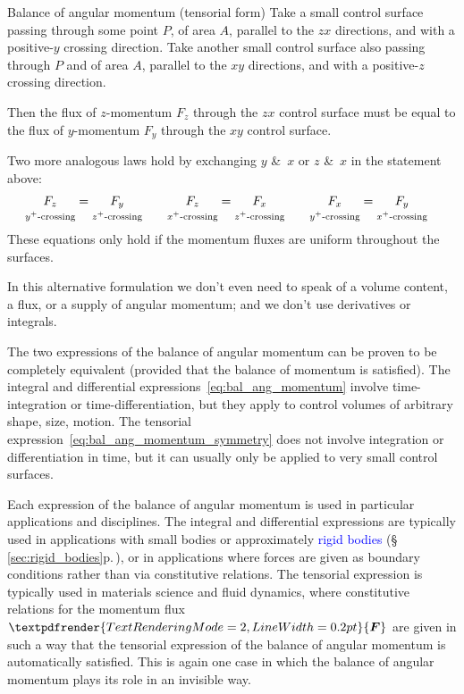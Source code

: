 \documentclass[a4paper,12pt,%
onecolumn,oneside,%
british%
]{memoir}
\newcommand*{\amp}{\&}
\renewcommand*{\bm}[1]{\textpdfrender{TextRenderingMode=2,LineWidth=0.2pt}{\boldsymbol{#1}}}
\renewcommand*{\|}[1][]{\nonscript\:#1\vert\nonscript\:\mathopen{}}
\newcommand*{\sect}{\S}%
\renewcommand*{\autoref}[3][\sect\,\ref]{\textcolor{blue}{#3} {\color{blue}\scriptsize(\faIcon[regular]{eye}\;#1{#2}\;p.\,\pageref{#2})}}
\newcommand*{\yF}{\bm{F}}
\begin{document}
\begin{definition}{Balance of angular momentum (tensorial form)}
  Take a small control surface passing through some point $P$, of area $A$, parallel to the $zx$ directions, and with a positive-$y$ crossing direction. Take another small control surface also passing through $P$ and of area $A$, parallel to the $xy$ directions, and with a positive-$z$ crossing direction.

  \smallskip

  Then the flux of $z$-momentum $F_{z}$ through the $zx$ control surface must be equal to the flux of $y$-momentum $F_{y}$ through the $xy$ control surface.

\smallskip

  Two more analogous laws hold by exchanging $y$ \amp\ $x$ or $z$ \amp\ $x$ in the statement above:
  \begin{equation}
    \label{eq:bal_ang_momentum_symmetry}
    \begin{aligned}
      \underbracket[0pt]{\smash{F_{z}}}_{\text{$y^{+}$-crossing}}
      &=
      \underbracket[0pt]{\smash{F_{y}}}_{\text{$z^{+}$-crossing}}
&\quad
      \underbracket[0pt]{\smash{F_{z}}}_{\text{$x^{+}$-crossing}}
      &=
      \underbracket[0pt]{\smash{F_{x}}}_{\text{$z^{+}$-crossing}}
&\quad
      \underbracket[0pt]{\smash{F_{x}}}_{\text{$y^{+}$-crossing}}
      &=
      \underbracket[0pt]{\smash{F_{y}}}_{\text{$x^{+}$-crossing}}
    \end{aligned}
  \end{equation}
  These equations only hold if the momentum fluxes are uniform throughout the surfaces.
\end{definition}
In this alternative formulation we don't even need to speak of a volume content, a flux, or a supply of angular momentum; and we don't use derivatives or integrals.

The two expressions of the balance of angular momentum can be proven to be completely equivalent (provided that the balance of momentum is satisfied). The integral and differential expressions~\eqref{eq:bal_ang_momentum} involve time-integration or time-differentiation, but they apply to control volumes of arbitrary shape, size, motion. The tensorial expression~\eqref{eq:bal_ang_momentum_symmetry} does not involve integration or differentiation in time, but it can usually only be applied to very small control surfaces.

Each expression of the balance of angular momentum is used in particular applications and disciplines. The integral and differential expressions are typically used in applications with small bodies or approximately \autoref{sec:rigid_bodies}{rigid bodies}, or in applications where forces are given as boundary conditions rather than via constitutive relations. The tensorial expression is typically used in materials science and fluid dynamics, where constitutive relations for the momentum flux $\yF$ are given in such a way that the tensorial expression of the balance of angular momentum is automatically satisfied. This is again one case in which the balance of angular momentum plays its role in an invisible way.
\end{document}
